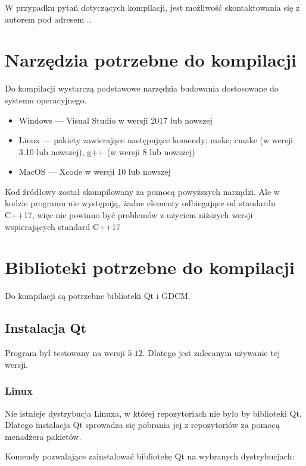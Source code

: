 


W przypadku pytań dotyczących kompilacji, jest możliwość skontaktowania się z autorem pod adresem \mailToMe..

\section{Narzędzia potrzebne do kompilacji}

\par
Do kompilacji wystarczą podstawowe narzędzia budowania dostosowane do systemu operacyjnego.

\begin{itemize}
    \item Windows --- Visual Studio w wersji 2017 lub nowszej
    \item Linux --- pakiety zawierające następujące komendy: make; cmake (w wersji 3.10 lub nowszej), g++ (w wersji 8 lub nowszej)
    \item MacOS --- Xcode w wersji 10 lub nowszej
\end{itemize}

Kod źródłowy został skompilowany za pomocą powyższych narządzi.
Ale w kodzie programu nie występują, żadne elementy odbiegające od standardu C++17, więc nie powinno być problemów z użyciem niższych wersji wspierających standard C++17

\section{Biblioteki potrzebne do kompilacji}

Do kompilacji są potrzebne biblioteki Qt i GDCM.

\subsection{Instalacja Qt}

Program był testowany na wersji $5.12$.
Dlatego jest zalecanym używanie tej wersji.

\subsubsection*{Linux}

Nie istnieje dystrybucja Linuxa, w której repozytoriach nie było by biblioteki Qt.
Dlatego instalacja Qt sprowadza się pobrania jej z repozytoriów za pomocą menadżera pakietów.
\par
Komendy pozwalające zainstalować bibliotekę Qt na wybranych dystrybucjach:\\


